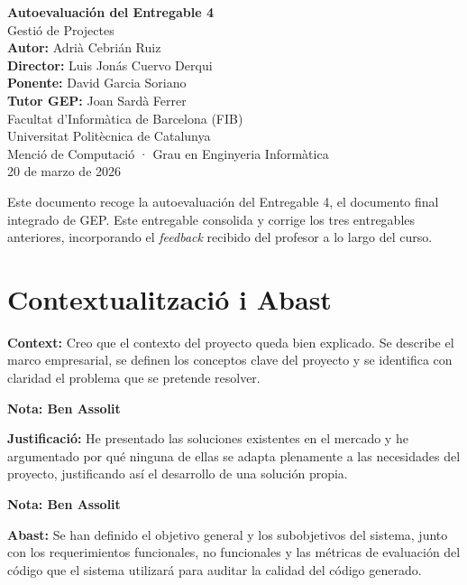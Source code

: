 \documentclass[12pt, a4paper]{article}
\begin{document}
\begin{titlepage}
    \centering
    \vspace*{3cm}
    {\LARGE\bfseries Autoevaluación del Entregable 4\\[0.5em]}
    {\large Gestió de Projectes\\[3em]}
    {\normalsize
        \textbf{Autor:} Adrià Cebrián Ruiz\\[0.4em]
        \textbf{Director:} Luis Jonás Cuervo Derqui\\[0.4em]
        \textbf{Ponente:} David Garcia Soriano\\[0.4em]
        \textbf{Tutor GEP:} Joan Sardà Ferrer\\[2em]
        Facultat d'Informàtica de Barcelona (FIB)\\
        Universitat Politècnica de Catalunya\\
        Menció de Computació · Grau en Enginyeria Informàtica\\[2em]
        20 de marzo de 2026
    }
\end{titlepage}

\noindent Este documento recoge la autoevaluación del Entregable 4, el documento final integrado de GEP. Este entregable consolida y corrige los tres entregables anteriores, incorporando el \textit{feedback} recibido del profesor a lo largo del curso.

\section{Contextualització i Abast}

\textbf{Context:} Creo que el contexto del proyecto queda bien explicado. Se describe el marco empresarial, se definen los conceptos clave del proyecto y se identifica con claridad el problema que se pretende resolver.

\textbf{Nota: Ben Assolit}

\textbf{Justificació:} He presentado las soluciones existentes en el mercado y he argumentado por qué ninguna de ellas se adapta plenamente a las necesidades del proyecto, justificando así el desarrollo de una solución propia.

\textbf{Nota: Ben Assolit}

\textbf{Abast:} Se han definido el objetivo general y los subobjetivos del sistema, junto con los requerimientos funcionales, no funcionales y las métricas de evaluación del código que el sistema utilizará para auditar la calidad del código generado.
\end{document}
